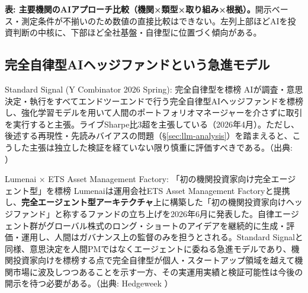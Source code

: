 \smallskip
{\small\color{figgray}\textbf{表: 主要機関のAIアプローチ比較（機関×類型×取り組み×根拠）。}開示ベース・測定条件が不揃いのため数値の直接比較はできない。左列上部ほどAIを投資判断の中核に、下部ほど全社基盤・自律型に位置づく傾向がある。}

\subsection{完全自律型AIヘッジファンドという急進モデル}

\begin{casestudy}{Standard Signal (Y Combinator 2026 Spring): 完全自律型を標榜}
AIが調査・意思決定・執行をすべてエンドツーエンドで行う完全自律型AIヘッジファンドを標榜し、強化学習モデルを用いて人間のポートフォリオマネージャーを介さずに取引を実行すると主張。ライブSharpe比3超を主張している（2026年4月）。ただし、後述する再現性・先読みバイアスの問題（\S\ref{sec:llm-analysis}）を踏まえると、こうした主張は独立した検証を経ていない限り慎重に評価すべきである。（出典: \cite{ycombinator2026standardsignal}）
\end{casestudy}

\begin{casestudy}{Lumenai × ETS Asset Management Factory: 「初の機関投資家向け完全エージェント型」を標榜}
Lumenaiは運用会社ETS Asset Management Factoryと提携し、\textbf{完全エージェント型アーキテクチャ}上に構築した「初の機関投資家向けヘッジファンド」と称するファンドの立ち上げを2026年6月に発表した。自律エージェント群がグローバル株式のロング・ショートのアイデアを継続的に生成・評価・運用し、人間はガバナンス上の監督のみを担うとされる。Standard Signalと同様、意思決定を人間PMではなくエージェントに委ねる急進モデルであり、機関投資家向けを標榜する点で完全自律型が個人・スタートアップ領域を越えて機関市場に波及しつつあることを示す一方、その実運用実績と検証可能性は今後の開示を待つ必要がある。（出典: Hedgeweek \cite{lumenai2026}）
\end{casestudy}

